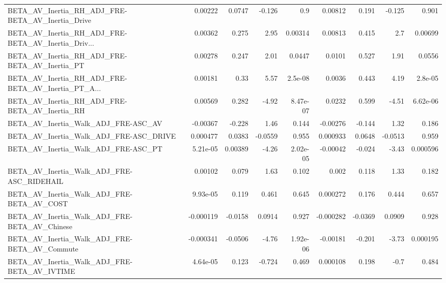 \begin{tabular}{lrrrrrrrr}
BETA\_AV\_Inertia\_RH\_ADJ\_FRE-BETA\_AV\_Inertia\_Drive   &     0.00222 &       0.0747 &   -0.126 &      0.9 &    0.00812 &       0.191 &       -0.125 &         0.901 \\
BETA\_AV\_Inertia\_RH\_ADJ\_FRE-BETA\_AV\_Inertia\_Driv... &     0.00362 &        0.275 &     2.95 &  0.00314 &    0.00813 &       0.415 &          2.7 &       0.00699 \\
BETA\_AV\_Inertia\_RH\_ADJ\_FRE-BETA\_AV\_Inertia\_PT      &     0.00278 &        0.247 &     2.01 &   0.0447 &     0.0101 &       0.527 &         1.91 &        0.0556 \\
BETA\_AV\_Inertia\_RH\_ADJ\_FRE-BETA\_AV\_Inertia\_PT\_A... &     0.00181 &         0.33 &     5.57 &  2.5e-08 &     0.0036 &       0.443 &         4.19 &       2.8e-05 \\
BETA\_AV\_Inertia\_RH\_ADJ\_FRE-BETA\_AV\_Inertia\_RH      &     0.00569 &        0.282 &    -4.92 & 8.47e-07 &     0.0232 &       0.599 &        -4.51 &      6.62e-06 \\
BETA\_AV\_Inertia\_Walk\_ADJ\_FRE-ASC\_AV                &    -0.00367 &       -0.228 &     1.46 &    0.144 &   -0.00276 &      -0.144 &         1.32 &         0.186 \\
BETA\_AV\_Inertia\_Walk\_ADJ\_FRE-ASC\_DRIVE             &    0.000477 &       0.0383 &  -0.0559 &    0.955 &   0.000933 &      0.0648 &      -0.0513 &         0.959 \\
BETA\_AV\_Inertia\_Walk\_ADJ\_FRE-ASC\_PT                &    5.21e-05 &      0.00389 &    -4.26 & 2.02e-05 &   -0.00042 &      -0.024 &        -3.43 &      0.000596 \\
BETA\_AV\_Inertia\_Walk\_ADJ\_FRE-ASC\_RIDEHAIL          &     0.00102 &        0.079 &     1.63 &    0.102 &      0.002 &       0.118 &         1.33 &         0.182 \\
BETA\_AV\_Inertia\_Walk\_ADJ\_FRE-BETA\_AV\_COST          &    9.93e-05 &        0.119 &    0.461 &    0.645 &   0.000272 &       0.176 &        0.444 &         0.657 \\
BETA\_AV\_Inertia\_Walk\_ADJ\_FRE-BETA\_AV\_Chinese       &   -0.000119 &      -0.0158 &   0.0914 &    0.927 &  -0.000282 &     -0.0369 &       0.0909 &         0.928 \\
BETA\_AV\_Inertia\_Walk\_ADJ\_FRE-BETA\_AV\_Commute       &   -0.000341 &      -0.0506 &    -4.76 & 1.92e-06 &   -0.00181 &      -0.201 &        -3.73 &      0.000195 \\
BETA\_AV\_Inertia\_Walk\_ADJ\_FRE-BETA\_AV\_IVTIME        &    4.64e-05 &        0.123 &   -0.724 &    0.469 &   0.000108 &       0.198 &         -0.7 &         0.484 \\

\end{tabular}
